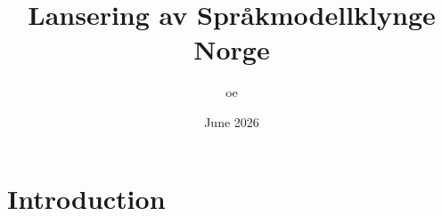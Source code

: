 \documentclass{article}
\title{Lansering av Språkmodellklynge Norge}
\author{oe }
\date{June 2026}
\begin{document}
\maketitle

\section{Introduction}
\end{document}
